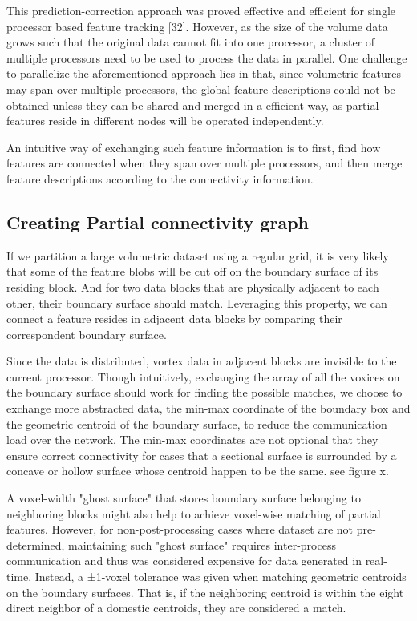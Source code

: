\documentclass[10pt, conference, compsocconf]{IEEEtran}
\begin{document}
This prediction-correction approach was proved effective and efficient for single processor based feature tracking [32]. However, as the size of the volume data grows such that the original data cannot fit into one processor, a cluster of multiple processors need to be used to process the data in parallel. One challenge to parallelize the aforementioned approach lies in that, since volumetric features may span over multiple processors, the global feature descriptions could not be obtained unless they can be shared and merged in a efficient way, as partial features reside in different nodes will be operated independently. 

An intuitive way of exchanging such feature information is to first, find how features are connected when they span over multiple processors, and then merge feature descriptions according to the connectivity information.

\subsection{Creating Partial connectivity graph}
If we partition a large volumetric dataset using a regular grid, it is very likely that some of the feature blobs will be cut off on the boundary surface of its residing block. And for two data blocks that are physically adjacent to each other, their boundary surface should match. Leveraging this property, we can connect a feature resides in adjacent data blocks by comparing their correspondent boundary surface. 

Since the data is distributed, vortex data in adjacent blocks are invisible to the current processor. Though intuitively, exchanging the array of all the voxices on the boundary surface should work for finding the possible matches, we choose to exchange more abstracted data, the min-max coordinate of the boundary box and the geometric centroid of the boundary surface, to reduce the communication load over the network. The min-max coordinates are not optional that they ensure correct connectivity for cases that a sectional surface is surrounded by a concave or hollow surface whose centroid happen to be the same. see figure x. 

A voxel-width "ghost surface" that stores boundary surface belonging to neighboring blocks might also help to achieve voxel-wise matching of partial features. However, for non-post-processing cases where dataset are not pre-determined, maintaining such "ghost surface" requires inter-process communication and thus was considered expensive for data generated in real-time. Instead, a ±1-voxel tolerance was given when matching geometric centroids on the boundary surfaces. That is, if the neighboring centroid is within the eight direct neighbor of a domestic centroids, they are considered a match.
\end{document}
